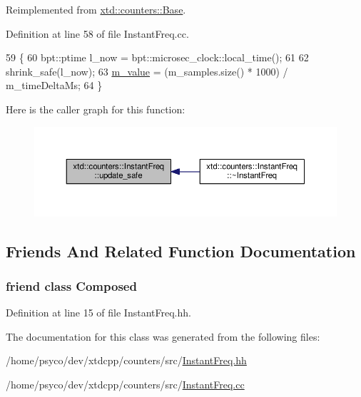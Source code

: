 Reimplemented from \hyperlink{classxtd_1_1counters_1_1Base_a8b3d10c9fb2bea1d240f887bbe4008ea}{xtd\+::counters\+::\+Base}.



Definition at line 58 of file Instant\+Freq.\+cc.


\begin{DoxyCode}
59 \{
60   bpt::ptime l\_now = bpt::microsec\_clock::local\_time();
61 
62   shrink\_safe(l\_now);
63   \hyperlink{classxtd_1_1counters_1_1Value_abe06c1cebededaf2f216707171f63c3c}{m\_value} = (m\_samples.size() * 1000) / m\_timeDeltaMs;
64 \}
\end{DoxyCode}


Here is the caller graph for this function\+:
\nopagebreak
\begin{figure}[H]
\begin{center}
\leavevmode
\includegraphics[width=350pt]{classxtd_1_1counters_1_1InstantFreq_a2e4629f5a835d7b52425a72f25dcd4d2_icgraph}
\end{center}
\end{figure}




\subsection{Friends And Related Function Documentation}
\subsubsection[{\texorpdfstring{Composed}{Composed}}]{\setlength{\rightskip}{0pt plus 5cm}friend class {\bf Composed}\hspace{0.3cm}{\ttfamily [friend]}}\hypertarget{classxtd_1_1counters_1_1InstantFreq_a93e934ad70d5b32b14beed5572450abf}{}\label{classxtd_1_1counters_1_1InstantFreq_a93e934ad70d5b32b14beed5572450abf}


Definition at line 15 of file Instant\+Freq.\+hh.



The documentation for this class was generated from the following files\+:\begin{DoxyCompactItemize}
\item 
/home/psyco/dev/xtdcpp/counters/src/\hyperlink{InstantFreq_8hh}{Instant\+Freq.\+hh}\item 
/home/psyco/dev/xtdcpp/counters/src/\hyperlink{InstantFreq_8cc}{Instant\+Freq.\+cc}\end{DoxyCompactItemize}
